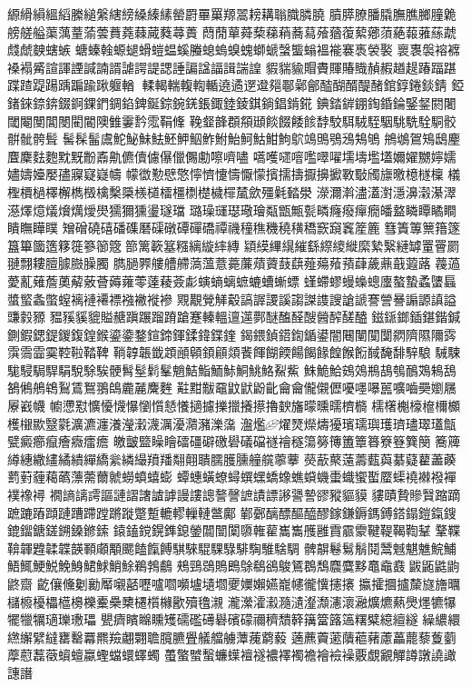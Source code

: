 縓縎縜縕縚縢縋縏縖縍縔縥縤罃罻罼罺羱翯耪耩聬膱膦膮
膹膵膫膰膬膴膲膷膧臲艕艖艗蕖蕅蕫蕍蕓蕡蕘蕀蕆蕤蕁蕢
蕄蕑蕇蕣蔾蕛蕱蕎蕮蕵蕕蕧蕠薌蕦蕝蕔蕥蕬虣虥虤螤螛螏
螗螓螒螈螁螖螘蝹螇螣螅螐螑螝螄螔螜螚螉褞褦褰褭褮褧
褱褢褩褣褯褬褟觱諠諢諲諴諵諝謔諤諟諰諈諞諡諨諿諯諻
貑貒貐賵賮賱賰賳赬赮趥趧踳踾踸蹀蹅踶踼踽蹁踰踿躽輶
輮輵輲輹輷輴遶遹遻邆郺鄳鄵鄶醓醐醑醍醏錧錞錈錟錆
錏鍺錸錼錛錣錒錁鍆錭錎錍鋋錝鋺錓鋹鋷錴錂錤鋿錩錹錵
錪錔錌錋鋾錉錀鋻錖閼闍閾閹閺閶閿閵閽隩雔霋霒霐鞙鞗
鞔韰韸頵頯頲餤餟餧餩馞駮駬駥駤駰駣駪駩駧骹骿骴骻髶
髺髹髷鬳鮀鮅鮇魼魾魻鮂鮓鮒鮐魺鮕魽鮈鴥鴗鴠鴞鴔鴩鴝
鴘鴢鴐鴙鴟麈麆麇麮麭黕黖黺鼒鼽儦儥儢儤儠儩勴嚓嚌嚍
嚆嚄嚃噾嚂噿嚁壖壔壏壒嬭嬥嬲嬣嬬嬧嬦嬯嬮孻寱寲嶷幬
幪徾懃憵憼懧懠懥懤懨懞擯擩擣擫擤擨斁斀斶旚曒檍檖檁
檥檉檟檛檡檞檇檓檎檕檃檨檤檑橿檦檚檅檌檒歛殭氉濌澩
濴濔濣濜濭濧濦濞濲濝濢濨燡燱燨燲燤燰燢獳獮獯璗璲璫
璐璪璭璱璥璯甐甑甒甏疄癃癈癉癇皤盩瞵瞫瞲瞷瞶瞴瞱瞨
矰磳磽礂磻磼磿磲礅磹磾礄禫禨穜穛穖穘穔穚窾竀竁簅簏
篲簀篿篻簎篴簋篳簂簉簃簁篸篽簆篰篱簐簊糨縭縼繂縳
顈縸縪繉繀繇縩繌縰縻縶繄縺罅罿罾罽翴翲耬膻臄臌臊臅
臇膼臩艛艚艜薃薀薏薧薕薠薋薣蕻薤薚薞蕷蕼薉薡蕺蕸蕗
薎薖薆薍薙薝薁薢薂薈薅蕹蕶薘薐薟虨螾螪螭蟅螰螬螹螵
螼螮蟉蟃蟂蟌螷螯蟄蟊螴螶螿螸螽蟞螲褵褳褼褾襁襒褷襂
覭覯覮觲觳謞謘謖謑謅謋謢謏謒謕謇謍謈謆謜謓謚豏豰豲
豱豯貕貔賹赯蹎蹍蹓蹐蹌蹇轃轀邅遾鄸醚醢醛醙醟醡醝醠
鎡鎃鎯鍤鍖鍇鍼鍘鍜鍶鍉鍐鍑鍠鍭鎏鍌鍪鍹鍗鍕鍒鍏鍱鍷
鍻鍡鍞鍣鍧鍎鍙闇闀闉闃闅閷隮隰隬霠霟霘霝霙鞚鞡鞜鞞
鞝韕韔韱顁顄顊顉顅顃餥餫餬餪餳餲餯餭餱餰馘馣馡騂駺
駴駷駹駸駶駻駽駾駼騃骾髾髽鬁髼魈鮚鮨鮞鮛鮦鮡鮥鮤鮆
鮢鮠鮯鴳鵁鵧鴶鴮鴯鴱鴸鴰鵅鵂鵃鴾鴷鵀鴽翵鴭麊麉麍麰
黈黚黻黿鼤鼣鼢齔⿕龠儱儭儮嚘嚜嚗嚚嚝嚙奰嬼屩屪巀幭
幮懘懟懭懮懱懪懰懫懖懩擿攄擽擸攁攃擼斔旛曚曛曘櫅檹
檽櫡櫆檺檶檷櫇檴檭歞毉氋瀇瀌瀍瀁瀅瀔瀎濿瀀濻瀦濼濷
瀊爁燿燹爃燽獶璸瓀璵瓁璾璶璻瓂甔甓癜癤癙癐癓癗癚
皦皽盬矂瞺礌礓礔礉礐礒礑禭禬穟簜簩簙簠簟簭簝簦簨簢
簥簰繜繐繖繣繘繢繟繑繠繗繓羵羳翷翸聵臑臒臐艟艞薴藆
藀藃藂薳薵薽藇藄薿藋藎藈藅薱薶藒蘤薸薷薾虩蟧蟦蟢蟛
蟫蟪蟥蟟蟳蟤蟔蟜蟓蟭蟘蟣蟗蟙蠁蟴蟨蟝襓襋襏襌襆襐襑
襉謪謧謣謳謰謵譇謯謼謾謱謥謷謦謶謮謤謻謽謺豂豵貙貘
貗賾贄贂贀蹜蹢蹠蹗蹖蹞蹥蹧蹛蹚蹡蹝蹩蹔轆轇轈轋鄨鄺
鄻鄾醨醥醧醯醪鎵鎌鎒鎷鎛鎝鎉鎧鎎鎪鎞鎦鎕鎈鎙鎟鎀鎍
鎱鎑鎲鎤鎨鎴鎣闒闓闑隳雗雚巂雟雘雝霣霢霥鞬鞮鞨鞫鞤
鞪鞢鞥韗韙韖韘韺顐顑顒颸饁餼餺騏騋騉騍騄騑騊騅騇騆
髀髜鬈鬄鬅鬩鬵魊魌魋鯇鯆鯃鮿鯁鮵鮸鯓鮶鯄鮹鮽鵜鵓鵏
鵊鵛鵋鵙鵖鵌鵗鵒鵔鵟鵘鵚麎麌黟鼁鼀鼖鼥鼫鼪鼩鼨齌
齕儴儵劖勷厴嚫嚭嚦嚧嚪嚬壚壝壛夒嬽嬾嬿巃幰徿懻攇攐
攍攉攌攎斄旞旝曞櫧櫠櫌櫑櫙櫋櫟櫜櫐櫫櫏櫍櫞歠殰氌瀙
瀧瀠瀖瀫瀡瀢瀣瀩瀗瀤瀜爌爊爇爂爅犥犦犤犣犡瓋瓅璷瓃
甖癠矉矊矄矱礝礛礡礜礗礞禰穧穨簳簼簹簬簻糬糪繶繵繸
繰繷繯繺繲繴繨罋罊羃羆羷翽翾聸臗臕舋艤艡艣藫藱藭藙
藡藨藚藗藬藲藸藘藟藣藜藑藰藦藯藞藢蠀蟺蠃蟶蟷蠉蠌蠋
蠆蟼蠈蟿蠊蠂襢襚襛襗襡襜襘襝襙覈覷覶觶譐譈譊譀譓譖
